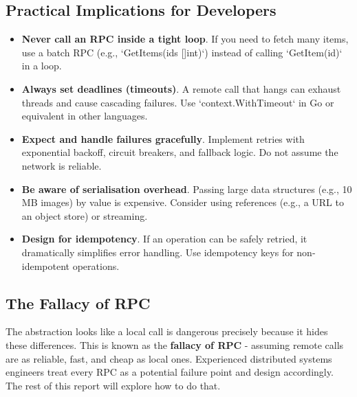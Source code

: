 \documentclass[a4paper]{article}
\begin{document}
\subsection{Practical Implications for Developers}
\begin{itemize}
    \item \textbf{Never call an RPC inside a tight loop}. If you need to fetch many items, use a batch RPC (e.g., `GetItems(ids []int)`) instead of calling `GetItem(id)` in a loop.
    \item \textbf{Always set deadlines (timeouts)}. A remote call that hangs can exhaust threads and cause cascading failures. Use `context.WithTimeout` in Go or equivalent in other languages.
    \item \textbf{Expect and handle failures gracefully}. Implement retries with exponential backoff, circuit breakers, and fallback logic. Do not assume the network is reliable.
    \item \textbf{Be aware of serialisation overhead}. Passing large data structures (e.g., 10 MB images) by value is expensive. Consider using references (e.g., a URL to an object store) or streaming.
    \item \textbf{Design for idempotency}. If an operation can be safely retried, it dramatically simplifies error handling. Use idempotency keys for non-idempotent operations.
\end{itemize}

\subsection{The Fallacy of RPC}
The abstraction looks like a local call is dangerous precisely because it hides these differences. This is known as the \textbf{fallacy of RPC} - assuming remote calls are as reliable, fast, and cheap as local ones. Experienced distributed systems engineers treat every RPC as a potential failure point and design accordingly. The rest of this report will explore how to do that.
\end{document}

